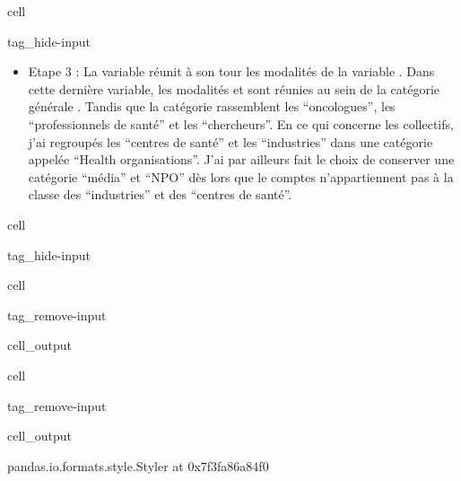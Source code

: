 \documentclass[letterpaper,10pt,english]{jupyterBook}
\begin{document}
\begin{sphinxuseclass}{cell}
\begin{sphinxuseclass}{tag_hide-input}
\end{sphinxuseclass}
\end{sphinxuseclass}\begin{itemize}
\item {} 
\sphinxAtStartPar
Etape 3 : La variable  réunit à son tour les modalités de la variable . Dans cette dernière variable, les modalités  et  sont réunies au sein de la catégorie générale . Tandis que la catégorie  rassemblent les “oncologues”, les “professionnels de santé” et les “chercheurs”. En ce qui concerne les collectifs, j’ai regroupés les “centres de santé” et les “industries” dans une catégorie appelée “Health organisations”. J’ai par ailleurs fait le choix de conserver une catégorie “média” et “NPO” dès lors que le comptes n’appartiennent pas à la classe des “industries” et des “centres de santé”.

\end{itemize}

\begin{sphinxuseclass}{cell}
\begin{sphinxuseclass}{tag_hide-input}
\end{sphinxuseclass}
\end{sphinxuseclass}
\begin{sphinxuseclass}{cell}
\begin{sphinxuseclass}{tag_remove-input}\begin{sphinxVerbatimOutput}

\begin{sphinxuseclass}{cell_output}
\end{sphinxuseclass}\end{sphinxVerbatimOutput}

\end{sphinxuseclass}
\end{sphinxuseclass}
\begin{sphinxuseclass}{cell}
\begin{sphinxuseclass}{tag_remove-input}\begin{sphinxVerbatimOutput}

\begin{sphinxuseclass}{cell_output}
\begin{sphinxVerbatim}[commandchars=\\\{\}]
\PYGZlt{}pandas.io.formats.style.Styler at 0x7f3fa86a84f0\PYGZgt{}
\end{sphinxVerbatim}

\end{sphinxuseclass}\end{sphinxVerbatimOutput}

\end{sphinxuseclass}
\end{sphinxuseclass}
\sphinxstepscope
\end{document}
